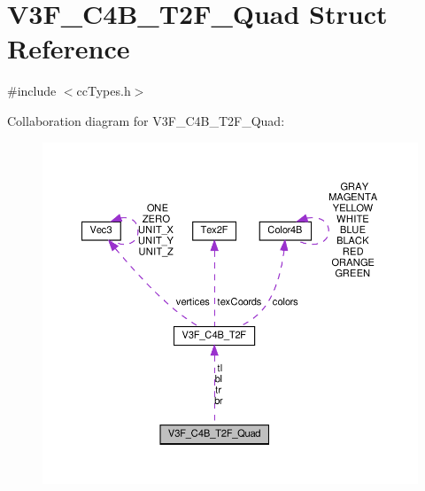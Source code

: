\hypertarget{structV3F__C4B__T2F__Quad}{}\section{V3\+F\+\_\+\+C4\+B\+\_\+\+T2\+F\+\_\+\+Quad Struct Reference}
\label{structV3F__C4B__T2F__Quad}


{\ttfamily \#include $<$cc\+Types.\+h$>$}



Collaboration diagram for V3\+F\+\_\+\+C4\+B\+\_\+\+T2\+F\+\_\+\+Quad\+:
\nopagebreak
\begin{figure}[H]
\begin{center}
\leavevmode
\includegraphics[width=350pt]{structV3F__C4B__T2F__Quad__coll__graph}
\end{center}
\end{figure}
